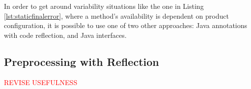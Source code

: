 In order to get around \gls{variability} situations like the one in Listing \ref{lst:staticfinalerror}, where a method's availability is dependent on product configuration, it is possible to use one of two other approaches: Java annotations with code reflection, and Java interfaces.


\subsection{Preprocessing with Reflection}
\label{sc:annotations}

\textcolor{red}{REVISE USEFULNESS}




